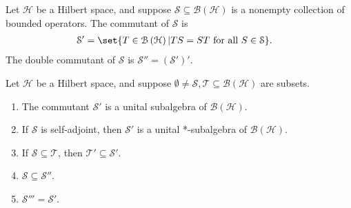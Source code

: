 \documentclass[10pt]{mypackage}
\begin{document}
\begin{definition}
  Let $\mathcal{H}$ be a Hilbert space, and suppose $\mathcal{S}\subseteq \mathcal{B}\left(\mathcal{H}\right)$ is a nonempty collection of bounded operators. The commutant of $\mathcal{S}$ is
  \begin{align*}
    \mathcal{S}' &= \set{T\in \mathcal{B}\left(\mathcal{H}\right) | TS = ST\text{ for all }S\in \mathcal{S}}.
  \end{align*}
  The double commutant of $\mathcal{S}$ is $\mathcal{S}'' = \left(\mathcal{S}'\right)'$.
\end{definition}
\begin{exercise}
  Let $\mathcal{H}$ be a Hilbert space, and suppose $\emptyset\neq \mathcal{S},\mathcal{T}\subseteq \mathcal{B}\left(\mathcal{H}\right)$ are subsets.
  \begin{enumerate}[(1)]
    \item The commutant $\mathcal{S}'$ is a unital subalgebra of $\mathcal{B}\left(\mathcal{H}\right)$.
    \item If $\mathcal{S}$ is self-adjoint, then $\mathcal{S}'$ is a unital *-subalgebra of $\mathcal{B}\left(\mathcal{H}\right)$.
    \item If $\mathcal{S}\subseteq \mathcal{T}$, then $\mathcal{T}' \subseteq \mathcal{S}'$.
    \item $\mathcal{S}\subseteq \mathcal{S}''$.
    \item $\mathcal{S}''' = \mathcal{S}'$.
  \end{enumerate}
\end{exercise}
\end{document}
